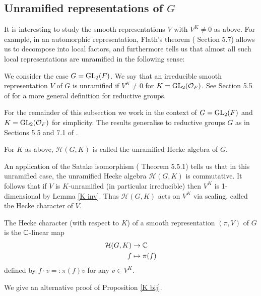 \subsection{Unramified representations of \texorpdfstring{$G$}{TEXT}}


It is interesting to study the smooth representations $V$ with $V^K \neq 0$ as above. For example, in an automorphic representation, Flath's theorem (\cite{GH1} Section 5.7) allows us to decompose into local factors, and furthermore tells us that almost all such local representations are unramified in the following sense:

\begin{defn}
    We consider the case $G=\mathrm{GL}_2(F)$. We say that an irreducible smooth representation $V$ of $G$ is unramified if $V^K \neq 0$ for $K= \mathrm{GL}_2(\mathcal{O}_F)$. See Section 5.5 of \cite{GH1} for a more general definition for reductive groups.
\end{defn}

For the remainder of this subsection we work in the context of $G=\mathrm{GL}_2(F)$ and $K = \mathrm{GL}_2(\mathcal{O}_F)$ for simplicity. The results generalise to reductive groups $G$ as in Sections 5.5 and 7.1 of \cite{GH1}.
\begin{defn}
    For $K$ as above, $\mathcal H(G,K)$ is called the unramified Hecke algebra of $G$.
\end{defn}

An application of the Satake isomorphism (\cite{GH1} Theorem 5.5.1) tells us that in this unramified case, the unramified Hecke algebra $\mathcal H(G,K)$ is commutative. It follows that if $V$ is $K$-unramified (in particular irreducible) then $V^K$ is 1-dimensional by Lemma \ref{K inv}. Thus $\mathcal H(G,K)$ acts on $V^K$ via scaling, called the Hecke character of $V$.

\begin{defn}
    The Hecke character (with respect to $K$) of a smooth representation $(\pi,V)$ of $G$ is the $\mathbb{C}$-linear map
    \begin{equation*}
        \begin{split}
            \mathcal H(G,K) &\to \mathbb{C} \\
            f &\mapsto \pi(f)
        \end{split}
    \end{equation*}
    defined by $f \cdot v =: \pi(f) v $ for any $v \in V^K$.
\end{defn}

We give an alternative proof of Proposition \ref{K bij}.

